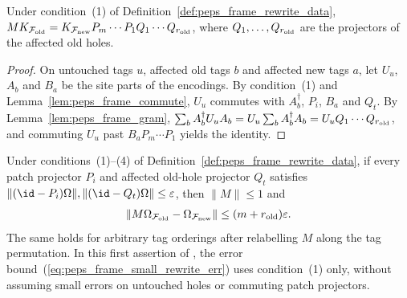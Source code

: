 \begin{lemma}
    \label{lem:peps_frame_rewrite_intertwining}
    \leanok
    Under condition~(1) of Definition~\ref{def:peps_frame_rewrite_data},
    $MK_{\mathcal F_{\rm old}}=K_{\mathcal F_{\rm new}}P_m\cdots P_1
        Q_1\cdots Q_{r_{\rm old}}$, where $Q_1,\dots,Q_{r_{\rm old}}$ are the
    projectors of the affected old holes.
\end{lemma}

\begin{proof}\leanok
    On untouched tags $u$, affected old tags $b$ and affected new tags $a$,
    let $U_u$, $A_b$ and $B_a$ be the site parts of the encodings. By
    condition~(1) and Lemma~\ref{lem:peps_frame_commute}, $U_u$ commutes with
    $A_b^\dagger$, $P_i$, $B_a$ and $Q_t$. By Lemma~\ref{lem:peps_frame_gram},
    $\sum_bA_b^\dagger U_uA_b=U_u\sum_bA_b^\dagger A_b
        =U_uQ_1\cdots Q_{r_{\rm old}}$, and commuting $U_u$ past $B_aP_m\cdots P_1$ yields the identity.
\end{proof}

\begin{theorem}
    \label{thm:peps_frame_small_rewrite}
    \leanok
    Under conditions~(1)--(4) of Definition~\ref{def:peps_frame_rewrite_data}, if every patch projector $P_i$ and affected
    old-hole projector $Q_t$ satisfies $\lVert(\id-P_i)\Omega\rVert,\lVert(\id-Q_t)\Omega\rVert\le\varepsilon$, then $\lVert M\rVert\le1$ and
    \begin{align}
        \lVert M\Omega_{\mathcal F_{\rm old}}-\Omega_{\mathcal F_{\rm new}}\rVert
        \le(m+r_{\rm old})\varepsilon .
        \label{eq:peps_frame_small_rewrite_err}
    \end{align}
    The same holds for arbitrary tag orderings after relabelling $M$ along the tag permutation. In this
    first assertion of \cite[Lemma~6.3]{OpenAI2026PolynomialPEPS}, the error bound~(\ref{eq:peps_frame_small_rewrite_err}) uses condition~(1) only, without assuming small errors on untouched holes or commuting patch projectors.
\end{theorem}

